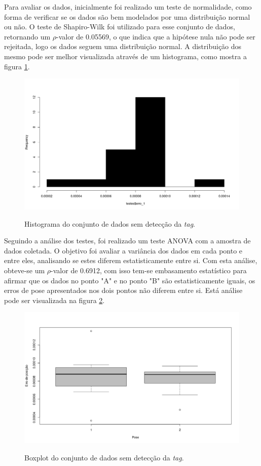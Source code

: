 Para avaliar os dados, inicialmente foi realizado um teste de normalidade, como forma de verificar se os dados são bem modelados por uma distribuição normal ou não. O teste de Shapiro-Wilk foi utilizado para esse conjunto de dados, retornando um $\rho$-valor de 0.05569, o que indica que a hipótese nula não pode ser rejeitada, logo os dados seguem uma distribuição normal. A distribuição dos mesmo pode ser melhor visualizada através de um histograma, como mostra a figura \ref*{fig:histo1}.

\begin{figure}[h!]
  \caption{Histograma do conjunto de dados sem detecção da \textit{tag}.}
  \centering
  \includegraphics[scale=0.4]{images/histo1.png}
  \label{fig:histo1}
\end{figure}

Seguindo a análise dos testes, foi realizado um teste ANOVA com a amostra de dados coletada. O objetivo foi avaliar a variância dos dados em cada ponto e entre eles, analisando se estes diferem estatisticamente entre si. Com esta análise, obteve-se um $\rho$-valor de 0.6912, com isso tem-se embasamento estatístico para afirmar que os dados no ponto "A" e no ponto "B" são estatisticamente iguais, os erros de pose apresentados nos dois pontos não diferem entre si. Está análise pode ser visualizada na figura \ref*{fig:box1}. 

\begin{figure}[h!]
  \caption{Boxplot do conjunto de dados sem detecção da \textit{tag}.}
  \centering
  \includegraphics[scale=0.4]{images/box1.png}
  \label{fig:box1}
\end{figure}

